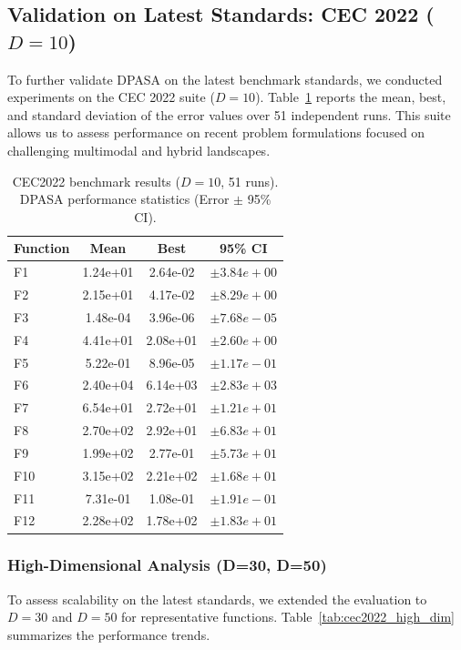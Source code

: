 \documentclass[11pt]{article}
\begin{document}
\subsection{Validation on Latest Standards: CEC 2022 ($D=10$)}
\label{sec:cec2022_results}

To further validate DPASA on the latest benchmark standards, we conducted experiments on the CEC 2022 suite ($D=10$). Table~\ref{tab:cec2022_results} reports the mean, best, and standard deviation of the error values over 51 independent runs. This suite allows us to assess performance on recent problem formulations focused on challenging multimodal and hybrid landscapes.

\begin{table}[!ht]
\centering
\caption{CEC2022 benchmark results ($D=10$, 51 runs). DPASA performance statistics (Error $\pm$ 95\% CI).}
\label{tab:cec2022_results}
\small
\begin{tabular}{@{}lccc@{}}
\toprule
Function & Mean & Best & 95\% CI \\
\midrule
F1 & 1.24e+01 & 2.64e-02 & $\pm 3.84e+00$ \\
F2 & 2.15e+01 & 4.17e-02 & $\pm 8.29e+00$ \\
F3 & 1.48e-04 & 3.96e-06 & $\pm 7.68e-05$ \\
F4 & 4.41e+01 & 2.08e+01 & $\pm 2.60e+00$ \\
F5 & 5.22e-01 & 8.96e-05 & $\pm 1.17e-01$ \\
F6 & 2.40e+04 & 6.14e+03 & $\pm 2.83e+03$ \\
F7 & 6.54e+01 & 2.72e+01 & $\pm 1.21e+01$ \\
F8 & 2.70e+02 & 2.92e+01 & $\pm 6.83e+01$ \\
F9 & 1.99e+02 & 2.77e-01 & $\pm 5.73e+01$ \\
F10 & 3.15e+02 & 2.21e+02 & $\pm 1.68e+01$ \\
F11 & 7.31e-01 & 1.08e-01 & $\pm 1.91e-01$ \\
F12 & 2.28e+02 & 1.78e+02 & $\pm 1.83e+01$ \\
\bottomrule
\end{tabular}
\end{table}

\subsubsection{High-Dimensional Analysis (D=30, D=50)}
\label{sec:cec2022_high_dim}

To assess scalability on the latest standards, we extended the evaluation to $D=30$ and $D=50$ for representative functions. Table~\ref{tab:cec2022_high_dim} summarizes the performance trends.
\end{document}
